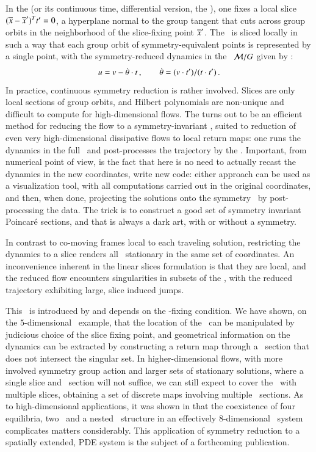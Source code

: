 \documentclass[preprint,number,sort&compress]{elsarticle}
\begin{document}
In the \emph{\mframes} (or its continuous time, differential
version, the \emph{\mslices}), one fixes a local slice
$(\overline{x} - {\overline{x}'} )^T t' =0$, a hyperplane normal
to the group tangent \sliceTan{} that cuts across group
orbits in the neighborhood of the slice-fixing point
${\overline{x}'}$. The \statesp\ is sliced locally in such a way
that each group orbit of symmetry-equivalent points is
represented by a single point, with the symmetry-reduced
dynamics in the \reducedsp\ ${\cal M}/G$ given by
:
\[
u = v - \dot{{\bf \theta}}  \cdot t
    \,,\qquad
\dot{{\bf \theta}} = (v \cdot t')/(t \cdot t')
\,.
\]
In practice, continuous symmetry reduction is rather
involved. Slices are only local sections of group orbits, and
Hilbert polynomials are non-unique and difficult to compute
for high-dimensional flows.
The {\mframes}
turns out to be an efficient method for reducing the
flow to a symmetry-in\-vari\-ant \reducedsp, suited to reduction
of {even very high-dimensional}
dissipative flows to local return maps:
one runs the dynamics in the full \statesp\ and
post-processes the trajectory by the \mframes.
Important, from numerical point of  view, is the
fact that here is no need to
actually recast the dynamics in the new coordinates,
write new code: either
approach can be used as a visualization tool, with all
computations carried out in the original coordinates, and
then, when done, projecting the solutions onto the symmetry
\reducedsp\ by post-processing the data. The trick is to
construct a good set of symmetry in\-vari\-ant Poincar\'e
sections, and that is always a dark art, with or without a
symmetry.

In contrast to co-moving frames local to each traveling
solution, {restricting the dynamics}
to a slice renders all \reqva\
stationary in the same set of coordinates. An inconvenience
inherent in the linear slices formulation is that they are
local, and the reduced flow encounters singularities in
subsets of the \reducedsp, with the reduced trajectory exhibiting
large, slice induced jumps.

This \sset\ is introduced by and
depends on the \slice-fixing condition. We have shown,
on the $5$-dimensional \cLe\ example, that the location of
the \sset\ can be manipulated by judicious choice of the slice
fixing point, and geometrical information on the dynamics can
be extracted by constructing a return map through a
\Poincare\ section that does not intersect the singular set.
In higher-dimensional flows, with more involved symmetry
group action and larger sets of stationary solutions, where a
single slice and \Poincare\ section will not suffice, we can
still expect to cover the \reducedsp\ with multiple slices,
obtaining a set of discrete maps involving multiple
\Poincare\ sections. As to high-dimensional applications,
it was shown in  that the coexistence
of four equilibria, two \reqva\ and a nested \fixedsp\
structure in an effectively $8$-dimensional \KS\
system complicates matters considerably. This
application of symmetry reduction to a spatially extended,
PDE system is the
subject of a forthcoming publication\rf{SCD09b}.
\end{document}
